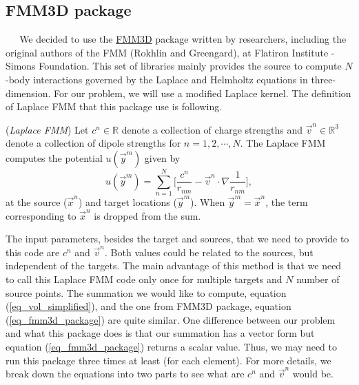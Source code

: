 \subsection{FMM3D package}
$\ \ \ \ \ $  
We decided to use the \href{https://github.com/flatironinstitute/FMM3D}{FMM3D} package written by researchers, including the original authors of the FMM (Rokhlin and Greengard), at Flatiron Institute - Simons Foundation. This set of  libraries mainly provides the source to compute $N$-body interactions governed by the Laplace and Helmholtz equations in three-dimension. For our problem, we will use a modified Laplace kernel.
The definition of Laplace FMM that this package use is following.
\begin{definition} (\textit{Laplace FMM})
	Let $c^n \in \mathbb{R}$ denote a collection of charge strengths and $\vec{v}^n \in \mathbb{R}^3$ denote a collection of dipole strengths for $n = 1,2, \cdots, N$.
	The Laplace FMM computes the potential $u(\vec{y}^m)$ given by
\begin{equation}
	u(\vec{y}^m) = \sum_{n = 1}^{N} 
		\Biggl[
		\frac{c^n}{r_{nm}}
			- \vec{v}^n \cdot \nabla 
			 \frac{1}{r_{nm}}
		\Biggr],
\label{eq_fmm3d_package}
\end{equation}
	at the source ($\vec{x}^n$) and target locations ($\vec{y}^m$).
	When $\vec{y}^m = \vec{x}^n$, the term corresponding to $\vec{x}^n$
	is dropped from the sum.
\end{definition}
The input parameters, besides the target and sources, that we need to provide to this code are $c^n$ and $\vec{v}^n$. Both values could be related to the sources, but independent of the targets.
The main advantage of this method is that we need to call this Laplace FMM code only once for multiple targets and $N$ number of source points. The summation we would like to compute, equation (\ref{eq_vol_simplified}), and the one from FMM3D package, equation (\ref{eq_fmm3d_package}) are quite similar. One difference between our problem and what this package does is that our summation has a vector form but equation (\ref{eq_fmm3d_package}) returns a scalar value. Thus, we may need to run this package three times at least (for each element). For more details, we break down the equations into two parts to see what are $c^n$ and $\vec{v}^n$ would be.
